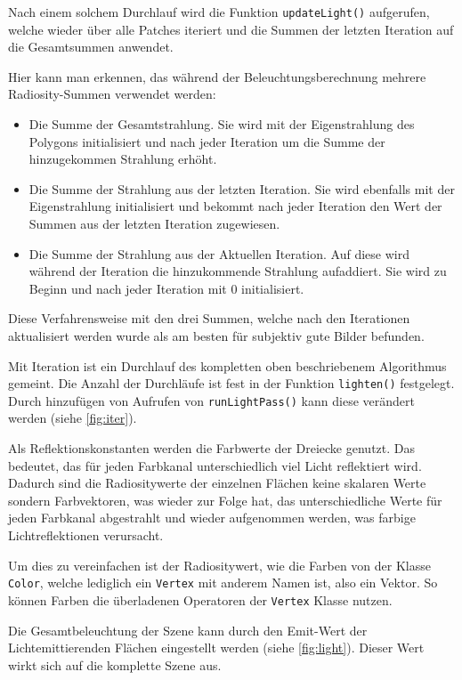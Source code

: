 \documentclass[final,a4paper,11pt,notitlepage,halfparskip]{scrreprt}
\begin{document}
Nach einem solchem Durchlauf wird die Funktion \texttt{updateLight()}
aufgerufen, welche wieder über alle Patches iteriert und die Summen der letzten
Iteration auf die Gesamtsummen anwendet.

Hier kann man erkennen, das während der Beleuchtungsberechnung mehrere
Radiosity-Summen verwendet werden:
\begin{itemize}
  \item Die Summe der Gesamtstrahlung. Sie wird mit der Eigenstrahlung des
    Polygons initialisiert und nach jeder Iteration um die Summe der
    hinzugekommen Strahlung erhöht.
  \item Die Summe der Strahlung aus der letzten Iteration. Sie wird ebenfalls
    mit der Eigenstrahlung initialisiert und bekommt nach jeder Iteration den
    Wert der Summen aus der letzten Iteration zugewiesen.
  \item Die Summe der Strahlung aus der Aktuellen Iteration. Auf diese wird
    während der Iteration die hinzukommende Strahlung aufaddiert. Sie wird zu
    Beginn und nach jeder Iteration mit $0$ initialisiert.
\end{itemize}
Diese Verfahrensweise mit den drei Summen, welche nach den Iterationen
aktualisiert werden wurde als am besten für subjektiv gute Bilder befunden.

Mit Iteration ist ein Durchlauf des kompletten oben beschriebenem Algorithmus
gemeint. Die Anzahl der Durchläufe ist fest in der Funktion \texttt{lighten()} 
festgelegt. Durch hinzufügen von Aufrufen von \texttt{runLightPass()} kann diese
verändert werden (siehe \ref{fig:iter}).

Als Reflektionskonstanten werden die Farbwerte der Dreiecke genutzt. Das
bedeutet, das für jeden Farbkanal unterschiedlich viel Licht reflektiert wird.
Dadurch sind die Radiositywerte der einzelnen Flächen keine skalaren Werte
sondern Farbvektoren, was wieder zur Folge hat, das unterschiedliche Werte für
jeden Farbkanal abgestrahlt und wieder aufgenommen werden, was farbige
Lichtreflektionen verursacht.

Um dies zu vereinfachen ist der Radiositywert, wie die Farben von der Klasse
\texttt{Color}, welche lediglich ein \texttt{Vertex} mit anderem Namen ist, also
ein Vektor. So können Farben die überladenen Operatoren der \texttt{Vertex}
Klasse nutzen.

Die Gesamtbeleuchtung der Szene kann durch den Emit-Wert der Lichtemittierenden
Flächen eingestellt werden (siehe \ref{fig:light}). Dieser Wert wirkt sich auf
die komplette Szene aus.
\end{document}
